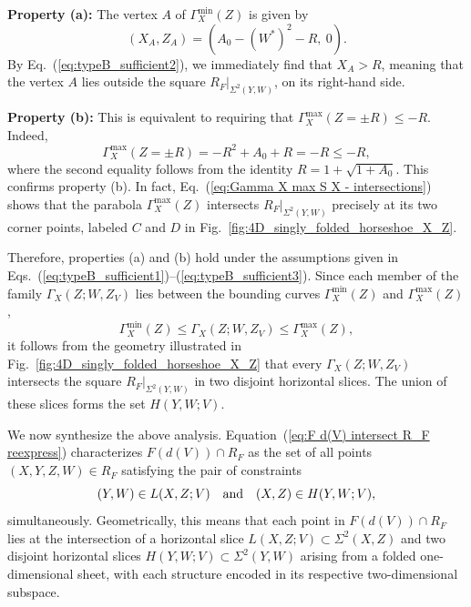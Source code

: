 \documentclass[12pt]{iopart}
\begin{document}
\textbf{Property (a):} The vertex \( A \) of \( \Gamma_X^{\min}(Z) \) is given by
\begin{equation}\label{eq:Vertex Gamma X min}
(X_A, Z_A) = \left( A_0 - (W^*)^2 - R,\ 0 \right).
\end{equation}
By Eq.~(\ref{eq:typeB_sufficient2}), we immediately find that \( X_A > R \), meaning that the vertex \( A \) lies outside the square \( R_F|_{\Sigma^2(Y,W)} \), on its right-hand side.

\textbf{Property (b):} This is equivalent to requiring that \( \Gamma_X^{\max}(Z = \pm R) \leq -R \). Indeed,
\begin{equation}\label{eq:Gamma X max S X - intersections}
\Gamma_X^{\max}(Z = \pm R) = -R^2 + A_0 + R = -R \leq -R,
\end{equation}
where the second equality follows from the identity \( R = 1 + \sqrt{1 + A_0} \). This confirms property (b). In fact, Eq.~(\ref{eq:Gamma X max S X - intersections}) shows that the parabola \( \Gamma_X^{\max}(Z) \) intersects \( R_F|_{\Sigma^2(Y,W)} \) precisely at its two corner points, labeled \( C \) and \( D \) in Fig.~\ref{fig:4D_singly_folded_horseshoe_X_Z}.

Therefore, properties (a) and (b) hold under the assumptions given in Eqs.~(\ref{eq:typeB_sufficient1})--(\ref{eq:typeB_sufficient3}). Since each member of the family \( \Gamma_X(Z;W,Z_V) \) lies between the bounding curves \( \Gamma_X^{\min}(Z) \) and \( \Gamma_X^{\max}(Z) \),
\begin{equation}
\Gamma_X^{\min}(Z) \leq \Gamma_X(Z;W,Z_V) \leq \Gamma_X^{\max}(Z),
\end{equation}
it follows from the geometry illustrated in Fig.~\ref{fig:4D_singly_folded_horseshoe_X_Z} that every \( \Gamma_X(Z;W,Z_V) \) intersects the square \( R_F|_{\Sigma^2(Y,W)} \) in two disjoint horizontal slices. The union of these slices forms the set \( H(Y,W;V) \).

We now synthesize the above analysis. Equation~(\ref{eq:F d(V) intersect R_F reexpress}) characterizes \( F(d(V)) \cap R_F \) as the set of all points \( (X,Y,Z,W) \in R_F \) satisfying the pair of constraints
\[
(Y,W) \in L(X,Z;V) \quad {\rm and} \quad (X,Z) \in H(Y,W;V),
\]
simultaneously. Geometrically, this means that each point in \( F(d(V)) \cap R_F \) lies at the intersection of a horizontal slice \( L(X,Z;V) \subset \Sigma^2(X,Z) \) and two disjoint horizontal slices \( H(Y,W;V) \subset \Sigma^2(Y,W) \) arising from a folded one-dimensional sheet, with each structure encoded in its respective two-dimensional subspace.
\end{document}
